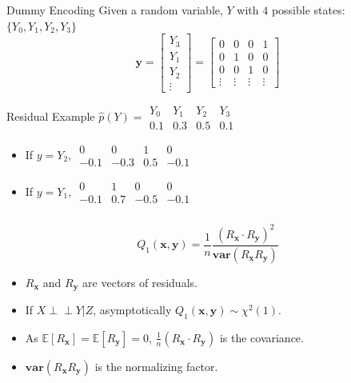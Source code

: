 \documentclass{beamer}
\def\ci{\perp\!\!\!\!\!\perp}
\begin{document}
\begin{frame}
	\frametitle{}
	\begin{block}{Dummy Encoding}
		Given a random variable, $ Y $ with $ 4 $ possible states: $ \{Y_0, Y_1, Y_2, Y_3 \} $
		\begin{equation*}
			\bm{y} = \left[ \begin{array}{c} Y_3 \\ Y_1 \\ Y_2 \\ \vdots \end{array} \right] = \left[ \begin{array}{cccc} 0 & 0 & 0 & 1 \\ 0 & 1 & 0 & 0 \\ 0 & 0 & 1 & 0 \\ \vdots & \vdots & \vdots & \vdots \end{array} \right]
		\end{equation*}
	\end{block}

	\begin{block}{Residual Example}
	$\hat{p}(Y) = \begin{array}{cccc} Y_0 & Y_1 & Y_2 & Y_3 \\ 0.1 & 0.3 & 0.5 & 0.1 \end{array} $
	\begin{itemize}
		\item If $ y = Y_2 $, $ \begin{array}{cccc} 0 & 0 & 1 & 0 \\ -0.1 & -0.3 & 0.5 & -0.1 \end{array} $
		\item If $ y = Y_1 $, $ \begin{array}{cccc} 0 & 1 & 0 & 0 \\ -0.1 & 0.7 & -0.5 & -0.1 \end{array} $
	\end{itemize}
	\end{block}	
\end{frame}

\begin{frame}
	\frametitle{}
	$$ Q_1(\bm{x}, \bm{y}) = \frac{1}{n} \frac{(R_{\bm{x}} \cdot R_{\bm{y}})^2}{\bm{var}(R_{\bm{x}} R_{\bm{y}})} $$
	\begin{center}
		\begin{itemize}
		\setlength\itemsep{1em}
			\item $ R_{\bm{x}} $ and $ R_{\bm{y}} $ are vectors of residuals.
			\item If $ X \ci Y | Z $, asymptotically $ Q_1(\bm{x}, \bm{y}) \sim \chi^2(1) $.
			\item As $ \mathbb{E}[R_{\bm{x}}] = \mathbb{E}[R_{\bm{y}}] = 0 $, $\frac{1}{n} (R_{\bm{x}} \cdot R_{\bm{y}}) $ is the covariance.
			\item $ \bm{var}(R_{\bm{x}} R_{\bm{y}}) $ is the normalizing factor.
		\end{itemize}
	\end{center}
\end{frame}
\end{document}
